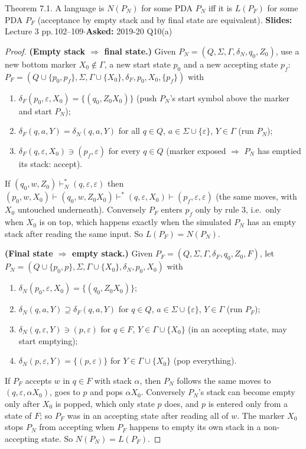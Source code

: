 \documentclass[10.5pt,a4paper]{article}
\newcommand{\src}[2]{{\footnotesize\color{gray!70!black}\textbf{Slides:} #1\enspace$\cdot$\enspace\textbf{Asked:} #2}\par}
\newcommand{\eps}{\varepsilon}
\begin{document}
\begin{thm}{Theorem 7.1. A language is $N(P_N)$ for some PDA $P_N$ iff it is $L(P_F)$ for some PDA $P_F$
(acceptance by empty stack and by final state are equivalent).}
\src{Lecture 3 pp.\,102--109}{2019-20 Q10(a)}\end{thm}
\begin{proof}
\textbf{(Empty stack $\Rightarrow$ final state.)} Given $P_N=(Q,\Sigma,\Gamma,\delta_N,q_0,Z_0)$, use a new bottom marker $X_0\notin\Gamma$, a new start
state $p_0$ and a new accepting state $p_f$:
$P_F=(Q\cup\{p_0,p_f\},\Sigma,\Gamma\cup\{X_0\},\delta_F,p_0,X_0,\{p_f\})$ with
\begin{enumerate}
\item $\delta_F(p_0,\eps,X_0)=\{(q_0,Z_0X_0)\}$ (push $P_N$'s start symbol above the marker and start $P_N$);
\item $\delta_F(q,a,Y)=\delta_N(q,a,Y)$ for all $q\in Q$, $a\in\Sigma\cup\{\eps\}$, $Y\in\Gamma$ (run $P_N$);
\item $\delta_F(q,\eps,X_0)\ni(p_f,\eps)$ for every $q\in Q$ (marker exposed $\Rightarrow$ $P_N$ has emptied its stack: accept).
\end{enumerate}
If $(q_0,w,Z_0)\vdash^*_N(q,\eps,\eps)$ then $(p_0,w,X_0)\vdash(q_0,w,Z_0X_0)\vdash^*(q,\eps,X_0)\vdash(p_f,\eps,\eps)$ (the same moves, with
$X_0$ untouched underneath). Conversely $P_F$ enters $p_f$ only by rule 3, i.e.\ only when $X_0$ is on top, which happens exactly when the
simulated $P_N$ has an empty stack after reading the same input. So $L(P_F)=N(P_N)$.

\textbf{(Final state $\Rightarrow$ empty stack.)} Given $P_F=(Q,\Sigma,\Gamma,\delta_F,q_0,Z_0,F)$, let\\
$P_N=(Q\cup\{p_0,p\},\Sigma,\Gamma\cup\{X_0\},\delta_N,p_0,X_0)$ with
\begin{enumerate}
\item $\delta_N(p_0,\eps,X_0)=\{(q_0,Z_0X_0)\}$;
\item $\delta_N(q,a,Y)\supseteq\delta_F(q,a,Y)$ for $q\in Q$, $a\in\Sigma\cup\{\eps\}$, $Y\in\Gamma$ (run $P_F$);
\item $\delta_N(q,\eps,Y)\ni(p,\eps)$ for $q\in F$, $Y\in\Gamma\cup\{X_0\}$ (in an accepting state, may start emptying);
\item $\delta_N(p,\eps,Y)=\{(p,\eps)\}$ for $Y\in\Gamma\cup\{X_0\}$ (pop everything).
\end{enumerate}
If $P_F$ accepts $w$ in $q\in F$ with stack $\alpha$, then $P_N$ follows the same moves to $(q,\eps,\alpha X_0)$, goes to $p$ and pops $\alpha X_0$.
Conversely $P_N$'s stack can become empty only after $X_0$ is popped, which only state $p$ does, and $p$ is entered only from a state of $F$;
so $P_F$ was in an accepting state after reading all of $w$. The marker $X_0$ stops $P_N$ from accepting when $P_F$ happens to empty its own
stack in a non-accepting state. So $N(P_N)=L(P_F)$.
\end{proof}
\end{document}
